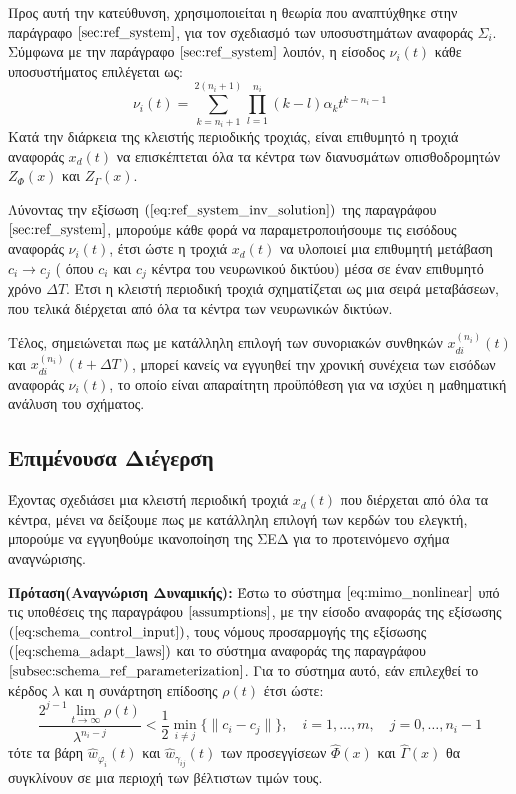 Προς αυτή την κατεύθυνση, χρησιμοποιείται η θεωρία που αναπτύχθηκε στην παράγραφο $\ref{sec:ref_system}$, για τον σχεδιασμό των υποσυστημάτων αναφοράς $\Sigma_i$. Σύμφωνα με την παράγραφο $\ref{sec:ref_system}$ λοιπόν, η είσοδος $\nu_i(t)$ κάθε υποσυστήματος επιλέγεται ως:
\begin{equation}
	\nu_i(t) = \sum_{k=n_i + 1}^{2(n_i + 1)} \prod_{l = 1}^{n_i} (k-l) \alpha_k t^{k - n_i - 1}
\end{equation}
Κατά την διάρκεια της κλειστής περιοδικής τροχιάς, είναι επιθυμητό η τροχιά αναφοράς $x_d(t)$ να επισκέπτεται όλα τα κέντρα των διανυσμάτων οπισθοδρομητών $Z_{\Phi}(x)$ και $Z_{\Gamma}(x)$. 

Λύνοντας την εξίσωση $(\ref{eq:ref_system_inv_solution})$ της παραγράφου $\ref{sec:ref_system}$, μπορούμε κάθε φορά να παραμετροποιήσουμε τις εισόδους αναφοράς $\nu_i(t)$, έτσι ώστε η τροχιά $x_d(t)$ να υλοποιεί μια επιθυμητή μετάβαση $c_i \rightarrow c_j$ ( όπου $c_i$ και $c_j$ κέντρα του νευρωνικού δικτύου) μέσα σε έναν επιθυμητό χρόνο $\Delta T$. Έτσι η κλειστή περιοδική τροχιά σχηματίζεται ως μια σειρά μεταβάσεων, που τελικά διέρχεται από όλα τα κέντρα των νευρωνικών δικτύων.

Τέλος, σημειώνεται πως με κατάλληλη επιλογή των συνοριακών συνθηκών $x_{di}^{(n_i)}(t)$ και $x_{di}^{(n_i)}(t+ \Delta T)$, μπορεί κανείς να εγγυηθεί την χρονική συνέχεια των εισόδων αναφοράς $\nu_i(t)$, το οποίο είναι απαραίτητη προϋπόθεση για να ισχύει η μαθηματική ανάλυση του σχήματος.

\subsection{Επιμένουσα Διέγερση}
Έχοντας σχεδιάσει μια κλειστή περιοδική τροχιά $x_d(t)$ που διέρχεται από όλα τα κέντρα, μένει να δείξουμε πως με κατάλληλη επιλογή των κερδών του ελεγκτή, μπορούμε να εγγυηθούμε ικανοποίηση της ΣΕΔ για το προτεινόμενο σχήμα αναγνώρισης.

\textbf{Πρόταση(Αναγνώριση Δυναμικής):}
Έστω το σύστημα $\ref{eq:mimo_nonlinear}$ υπό τις υποθέσεις της παραγράφου $\ref{assumptions}$, με την είσοδο αναφοράς της εξίσωσης $(\ref{eq:schema_control_input})$, τους νόμους προσαρμογής της εξίσωσης $(\ref{eq:schema_adapt_laws})$ και το σύστημα αναφοράς της παραγράφου $\ref{subsec:schema_ref_parameterization}$. Για το σύστημα αυτό, εάν επιλεχθεί το κέρδος $\lambda$ και η συνάρτηση επίδοσης $\rho(t)$ έτσι ώστε:
\begin{equation}
	\frac{ 2^{j-1} \lim\limits_{t \rightarrow \infty}\rho(t)}{\lambda^{n_i - j}} < \frac{1}{2} \min_{i \neq j} \{\| c_i - c_j \| \},
	\quad i=1,\dots,m, \quad j = 0,\dots,n_i-1
	\label{eq:PE_hypothesis}
\end{equation}
τότε τα βάρη $\hat{w}_{\varphi_i}(t)$ και $\hat{w}_{\gamma_{ij}}(t)$ των προσεγγίσεων $\hat{\Phi}(x)$ και $\hat{\Gamma}(x)$ θα συγκλίνουν σε μια περιοχή των βέλτιστων τιμών τους.

